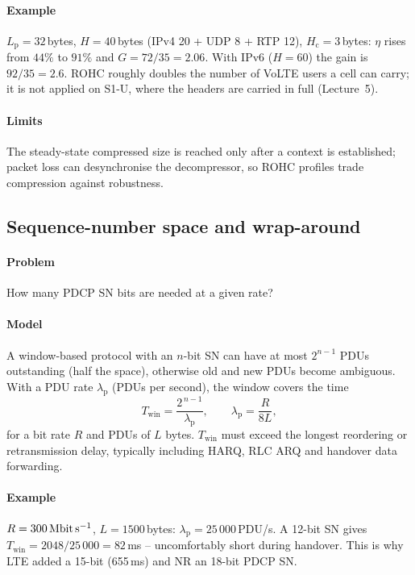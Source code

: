 \documentclass[11pt,a4paper]{article}
\begin{document}
\paragraph{Example} $L_\mathrm{p} = 32$\,bytes, $H = 40$\,bytes (IPv4 20 + UDP 8 + RTP 12),
$H_\mathrm{c} = 3$\,bytes: $\eta$ rises from $44\%$ to $91\%$ and $G = 72/35 = 2.06$. With IPv6
($H = 60$) the gain is $92/35 = 2.6$. ROHC roughly doubles the number of VoLTE users a cell can
carry; it is not applied on S1-U, where the headers are carried in full (Lecture~5).
\paragraph{Limits} The steady-state compressed size is reached only after a context is established;
packet loss can desynchronise the decompressor, so ROHC profiles trade compression against
robustness.

\subsection{Sequence-number space and wrap-around}\label{sec:sn}
\paragraph{Problem} How many PDCP SN bits are needed at a given rate?
\paragraph{Model} A window-based protocol with an $n$-bit SN can have at most $2^{n-1}$ PDUs
outstanding (half the space), otherwise old and new PDUs become ambiguous. With a PDU rate
$\lambda_\mathrm{p}$ (PDUs per second), the window covers the time
\begin{equation}\label{eq:snwin}
  T_{\mathrm{win}} = \frac{2^{\,n-1}}{\lambda_\mathrm{p}}, \qquad
  \lambda_\mathrm{p} = \frac{R}{8L},
\end{equation}
for a bit rate $R$ and PDUs of $L$ bytes. $T_{\mathrm{win}}$ must exceed the longest reordering
or retransmission delay, typically including HARQ, RLC ARQ and handover data forwarding.
\paragraph{Example} $R = \qty{300}{\mega\bit\per\second}$, $L = 1500$\,bytes:
$\lambda_\mathrm{p} = 25\,000$\,PDU/s. A 12-bit SN gives $T_{\mathrm{win}} = 2048/25\,000 = 82$\,ms
-- uncomfortably short during handover. This is why LTE added a 15-bit (655\,ms) and NR an 18-bit
PDCP SN.
\end{document}
